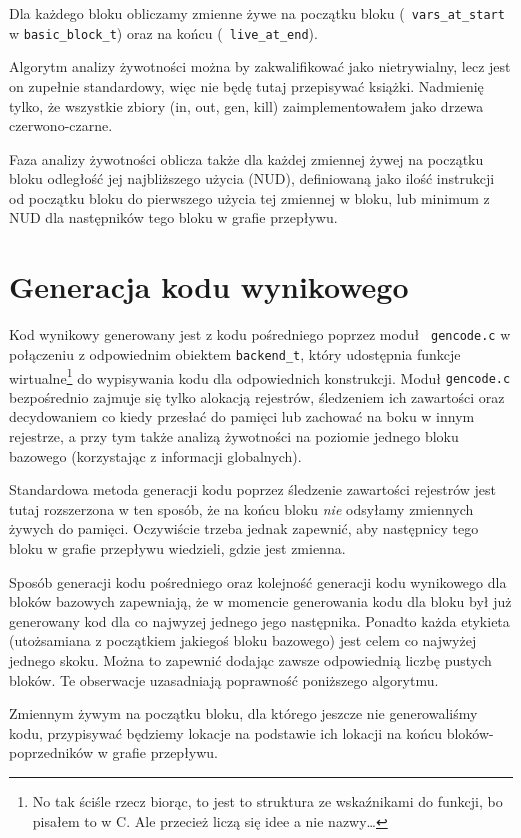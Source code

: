 \documentclass[a4paper,12pt]{article}
\begin{document}
Dla każdego bloku obliczamy zmienne żywe na początku bloku ({\tt
vars\_at\_start} w {\tt basic\_block\_t}) oraz na końcu ({\tt
live\_at\_end}).

Algorytm analizy żywotności można by zakwalifikować jako nietrywialny,
lecz jest on zupełnie standardowy, więc nie będę tutaj przepisywać
książki. Nadmienię tylko, że wszystkie zbiory (in, out, gen, kill)
zaimplementowałem jako drzewa czerwono-czarne.

Faza analizy żywotności oblicza także dla każdej zmiennej żywej na
początku bloku odległość jej najbliższego użycia (NUD), definiowaną jako
ilość instrukcji od początku bloku do pierwszego użycia tej zmiennej w
bloku, lub minimum z NUD dla następników tego bloku w grafie przepływu.

\section{Generacja kodu wynikowego}

Kod wynikowy generowany jest z kodu pośredniego poprzez moduł {\tt
gencode.c} w połączeniu z odpowiednim obiektem {\tt backend\_t}, który
udostępnia funkcje wirtualne\footnote{No tak ściśle rzecz biorąc, to
jest to struktura ze wskaźnikami do funkcji, bo pisałem to w C. Ale
przecież liczą się idee a nie nazwy\ldots} do wypisywania kodu dla
odpowiednich konstrukcji. Moduł {\tt gencode.c} bezpośrednio zajmuje się
tylko alokacją rejestrów, śledzeniem ich zawartości oraz decydowaniem co
kiedy przesłać do pamięci lub zachować na boku w innym rejestrze, a przy
tym także analizą żywotności na poziomie jednego bloku bazowego
(korzystając z informacji globalnych).

Standardowa metoda generacji kodu poprzez śledzenie zawartości rejestrów
jest tutaj rozszerzona w ten sposób, że na końcu bloku {\em nie}
odsyłamy zmiennych żywych do pamięci. Oczywiście trzeba jednak zapewnić,
aby następnicy tego bloku w grafie przepływu wiedzieli, gdzie jest
zmienna.

Sposób generacji kodu pośredniego oraz kolejność generacji kodu
wynikowego dla bloków bazowych zapewniają, że w momencie generowania
kodu dla bloku był już generowany kod dla co najwyzej jednego jego
następnika. Ponadto każda etykieta (utożsamiana z początkiem jakiegoś
bloku bazowego) jest celem co najwyżej jednego skoku. Można to zapewnić
dodając zawsze odpowiednią liczbę pustych bloków. Te obserwacje
uzasadniają poprawność poniższego algorytmu.

Zmiennym żywym na początku bloku, dla którego jeszcze nie generowaliśmy
kodu, przypisywać będziemy lokacje na podstawie ich lokacji na końcu
bloków-poprzedników w grafie przepływu.
\end{document}
